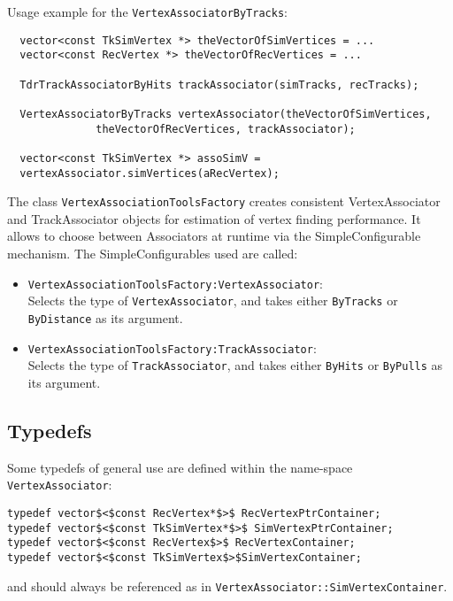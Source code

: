 Usage example for the  {\tt VertexAssociatorByTracks}:
\begin{verbatim}
  vector<const TkSimVertex *> theVectorOfSimVertices = ...
  vector<const RecVertex *> theVectorOfRecVertices = ...

  TdrTrackAssociatorByHits trackAssociator(simTracks, recTracks);

  VertexAssociatorByTracks vertexAssociator(theVectorOfSimVertices,
    	      theVectorOfRecVertices, trackAssociator);

  vector<const TkSimVertex *> assoSimV =
  vertexAssociator.simVertices(aRecVertex);

\end{verbatim}

The class \verb/VertexAssociationToolsFactory/ creates consistent
 VertexAssociator and TrackAssociator objects for estimation of vertex
 finding performance.
It allows to choose between Associators at runtime via
 the SimpleConfigurable mechanism.
The SimpleConfigurables used are called:

\begin{itemize}
\item \verb/VertexAssociationToolsFactory:VertexAssociator/:\\
Selects the type of \verb/VertexAssociator/, and 
 takes either \verb/ByTracks/ or \verb/ByDistance/ as its argument.
\item \verb/VertexAssociationToolsFactory:TrackAssociator/:\\
Selects the type of \verb/TrackAssociator/, and 
 takes either \verb/ByHits/ or \verb/ByPulls/ as its argument.
\end{itemize}


\subsection{Typedefs}
Some typedefs of general use are defined within the name-space
\verb/VertexAssociator/:
%
\begin{verbatim}
typedef vector$<$const RecVertex*$>$ RecVertexPtrContainer;
typedef vector$<$const TkSimVertex*$>$ SimVertexPtrContainer;
typedef vector$<$const RecVertex$>$ RecVertexContainer; 
typedef vector$<$const TkSimVertex$>$SimVertexContainer;
\end{verbatim}
%
and should always be referenced as in
\verb/VertexAssociator::SimVertexContainer/.
